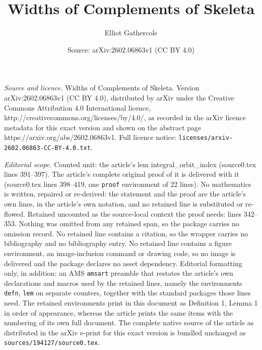\documentclass[10pt,a4paper]{amsart}
\title{Widths of Complements of Skeleta}
\author{Elliot Gathercole}
\date{Source: arXiv:2602.06863v1 (CC BY 4.0)}
\begin{document}
\maketitle

\noindent\emph{Source and licence.} Widths of Complements of Skeleta. Version arXiv:2602.06863v1 (CC BY 4.0), distributed by arXiv under the Creative Commons Attribution 4.0 International licence, http://creativecommons.org/licenses/by/4.0/, as recorded in the arXiv licence metadata for this exact version and shown on the abstract page https://arxiv.org/abs/2602.06863v1. Full licence notice: \texttt{licenses/arxiv-2602.06863-CC-BY-4.0.txt}.\par\smallskip

\noindent\textit{Editorial scope.} Counted unit: the article's lem integral\_orbit\_index (source0.tex lines 391--397). The article's complete original proof of it is delivered with it (source0.tex lines 398--419, one \texttt{proof} environment of 22 lines). No mathematics is written, repaired or re-derived: the statement and the proof are the article's own lines, in the article's own notation, and no retained line is substituted or re-flowed.  Retained uncounted as the source-local context the proof needs: lines 342--353.  Nothing was omitted from any retained span, so the package carries no omission record.  No retained line contains a citation, so the wrapper carries no bibliography and no bibliography entry.  No retained line contains a figure environment, an image-inclusion command or drawing code, so no image is delivered and the package declares no asset dependency.  Editorial formatting only, in addition: an AMS \texttt{amsart} preamble that restates the article's own declarations and macros used by the retained lines, namely the environments \texttt{defn}, \texttt{lem} on separate counters, together with the standard packages those lines need.  The retained environments print in this document as Definition 1, Lemma 1 in order of appearance, whereas the article prints the same items with the numbering of its own full document.  The complete native source of the article as distributed in the arXiv e-print for this exact version is bundled unchanged as \texttt{sources/194127/source0.tex}.
\end{document}
